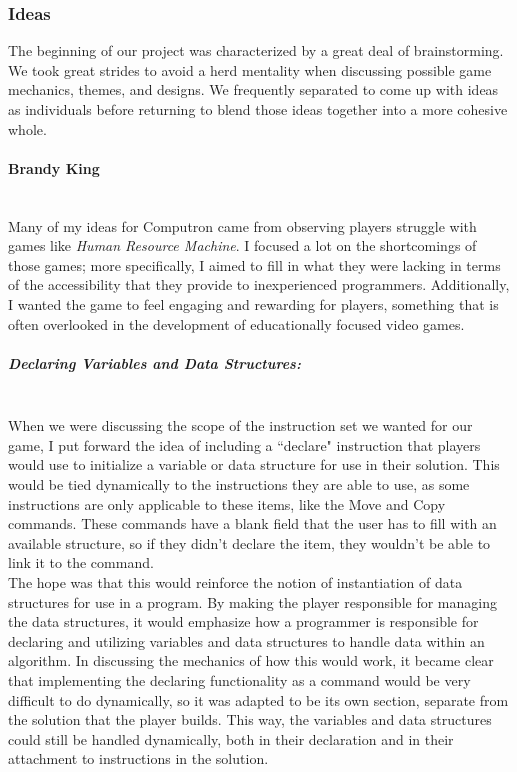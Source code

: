 \subsubsection{Ideas}
The beginning of our project was characterized by a great deal of brainstorming. We took great strides
to avoid a herd mentality when discussing possible game mechanics, themes, and designs. We frequently
separated to come up with ideas as individuals before returning to blend those ideas together into a more
cohesive whole.

\paragraph{Brandy King}\mbox{} \\
Many of my ideas for Computron came from observing players struggle with games like \textit{Human
Resource Machine}. I focused a lot on the shortcomings of those games; more specifically, I aimed to fill in
what they were lacking in terms of the accessibility that they provide to inexperienced programmers.
Additionally, I wanted the game to feel engaging and rewarding for players, something that is often
overlooked in the development of educationally focused video games. \\

\subparagraph{Declaring Variables and Data Structures:}\mbox{} \\
When we were discussing the scope of the instruction set we wanted for our game, I put forward the idea
of including a ``declare" instruction that players would use to initialize a variable or data structure for use
in their solution. This would be tied dynamically to the instructions they are able to use, as some instructions
are only applicable to these items, like the Move and Copy commands. These commands have a blank field
that the user has to fill with an available structure, so if they didn't declare the item, they wouldn't be able to
link it to the command.\\

The hope was that this would reinforce the notion of instantiation of data structures for use in a program. By
making the player responsible for managing the data structures, it would emphasize how a programmer
is responsible for declaring and utilizing variables and data structures to handle data within an algorithm. In
discussing the mechanics of how this would work, it became clear that implementing the declaring functionality
as a command would be very difficult to do dynamically, so it was adapted to be its own section, separate from
the solution that the player builds. This way, the variables and data structures could still be handled dynamically,
both in their declaration and in their attachment to instructions in the solution.\\

